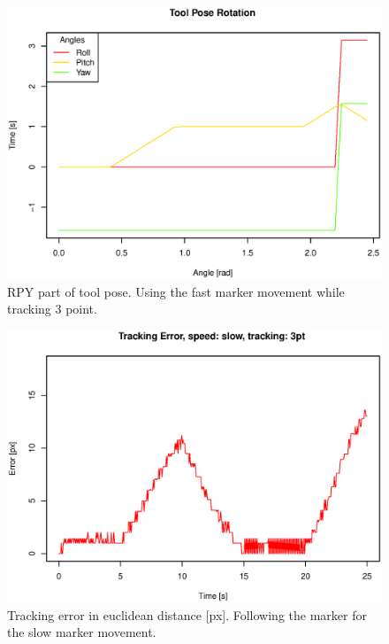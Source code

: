 \begin{figure}[H]
\centering
\includegraphics[width= \linewidth]{graphics/robotics/toolPose_fast_3pt}
\caption{RPY part of tool pose. Using the fast marker movement while tracking 3 point.}
\label{fig:toolpose_fast_3p_rpy}
\end{figure}


\begin{figure}[H]
\centering
\includegraphics[width= 0.9 \linewidth]{graphics/robotics/trackingError_slow_3pt}
\caption{Tracking error in euclidean distance [px].
Following the marker for the slow marker movement.}
\label{fig:trackingerror_slow_3p}
\end{figure}

